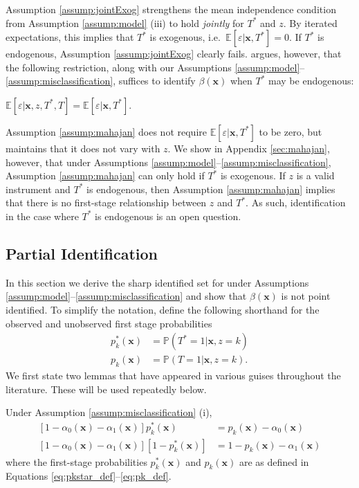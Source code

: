 Assumption \ref{assump:jointExog} strengthens the mean independence condition from Assumption \ref{assump:model} (iii) to hold \emph{jointly} for $T^*$ and $z$.
By iterated expectations, this implies that $T^*$ is exogenous, i.e.\ $\mathbb{E}[\varepsilon|\mathbf{x},T^*] = 0$.
If $T^*$ is endogenous, Assumption \ref{assump:jointExog} clearly fails.
\cite{Mahajan} argues, however, that the following restriction, along with our Assumptions \ref{assump:model}--\ref{assump:misclassification}, suffices to identify $\beta(\mathbf{x})$ when $T^*$ may be endogenous:
\begin{assump} \mbox{}
  \label{assump:mahajan}
  $\mathbb{E}[\varepsilon|\mathbf{x}, z, T^*, T] = \mathbb{E}[\varepsilon|\mathbf{x},T^*]$.
\end{assump}
Assumption \ref{assump:mahajan} does not require $\mathbb{E}[\varepsilon|\mathbf{x},T^*]$ to be zero, but maintains that it does not vary with $z$.
We show in Appendix \ref{sec:mahajan}, however, that under 
Assumptions \ref{assump:model}--\ref{assump:misclassification}, Assumption \ref{assump:mahajan} can only hold if $T^*$ is exogenous.
If $z$ is a valid instrument and $T^*$ is endogenous, then Assumption \ref{assump:mahajan} implies that there is no first-stage relationship between $z$ and $T^*$.
As such, identification in the case where $T^*$ is endogenous is an open question. 




\subsection{Partial Identification}

In this section we derive the sharp identified set for under Assumptions \ref{assump:model}--\ref{assump:misclassification} and show that  $\beta(\mathbf{x})$ is not point identified.
To simplify the notation, define the following shorthand for the observed and unobserved first stage probabilities
\begin{align}
  \label{eq:pkstar_def}
  p^*_k(\mathbf{x}) &= \mathbb{P}(T^*=1|\mathbf{x},z=k)\\
  \label{eq:pk_def}
  p_k(\mathbf{x}) &= \mathbb{P}(T=1|\mathbf{x},z=k).
\end{align}
We first state two lemmas that have appeared in various guises throughout the literature. 
These will be used repeatedly below.
\begin{lem}
\label{lem:p_pstar}
  Under Assumption \ref{assump:misclassification} (i),
\begin{align*}
  \left[ 1 - \alpha_0(\mathbf{x}) - \alpha_1(\mathbf{x}) \right]p^*_k(\mathbf{x}) &= p_k(\mathbf{x}) - \alpha_0(\mathbf{x})\\
  \left[ 1 - \alpha_0(\mathbf{x}) - \alpha_1(\mathbf{x}) \right]\left[1 - p^*_k(\mathbf{x}) \right]&= 1 - p_k(\mathbf{x}) - \alpha_1(\mathbf{x})
\end{align*}
where the first-stage probabilities $p_k^*(\mathbf{x})$ and $p_k(\mathbf{x})$ are as defined in Equations \ref{eq:pkstar_def}--\ref{eq:pk_def}.
\end{lem} 

